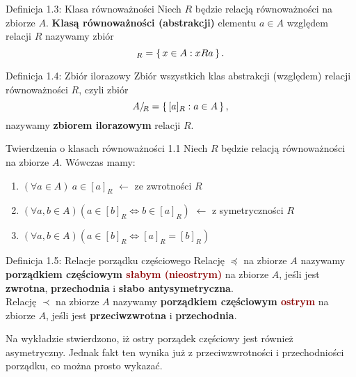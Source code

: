 \documentclass{article}
\newcommand{\ifff}{\Leftrightarrow}
\newcommand{\ilorazowy}[1]{#1/\!{_R}}
\begin{document}
\begin{defr}{Definicja 1.3: Klasa równoważności}
    Niech $R$ będzie relacją równoważności na zbiorze $A$.\textbf{ Klasą równoważności (abstrakcji)} elementu $a\in A$ względem
    relacji $R$ nazywamy zbiór
    \begin{equation*}
        [a]_R=\set{x\in A:xRa}.
    \end{equation*}
\end{defr}

\begin{defr}{Definicja 1.4: Zbiór ilorazowy}
    Zbiór wszystkich klas abstrakcji (względem) relacji równoważności $R$, czyli zbiór
    \begin{equation*}
        \ilorazowy{A}=\set{[a]_R:a\in A},
    \end{equation*}
    nazywamy \textbf{zbiorem ilorazowym} relacji $R$.
\end{defr}

\begin{twier}{Twierdzenia o klasach równoważności 1.1}
    Niech $R$ będzie relacją równoważności na zbiorze $A$. Wówczas mamy:
    \begin{enumerate}[label=(\roman*)]
        \item $(\forall a\in A)\ a\in [a]_R$ $\leftarrow$ ze zwrotności $R$
        \item $(\forall a,b\in A)(a\in [b]_R\ifff b\in [a]_R)$ $\leftarrow$ z symetryczności $R$
        \item $(\forall a,b\in A)(a\in [b]_R\ifff [a]_R=[b]_R)$
    \end{enumerate}
\end{twier}

\begin{defr}{Definicja 1.5: Relacje porządku częściowego}
    Relację $\preceq$ na zbiorze $A$ nazywamy \textbf{porządkiem częściowym 
    \textcolor{darkred}{słabym (nieostrym)}} na zbiorze $A$, jeśli jest \textbf{zwrotna},
    \textbf{przechodnia} i \textbf{słabo antysymetryczna}. \\ \smallskip
    Relację $\prec$ na zbiorze $A$ nazywamy \textbf{porządkiem częściowym \textcolor{darkred}{ostrym}} na
    zbiorze $A$, jeśli jest \textbf{przeciwzwrotna} i \textbf{przechodnia}.
\end{defr}

Na wykładzie stwierdzono, iż ostry porządek częściowy jest również asymetryczny. Jednak fakt ten wynika
już z przeciwzwrotności i przechodniości porządku, co można prosto wykazać.
\end{document}
